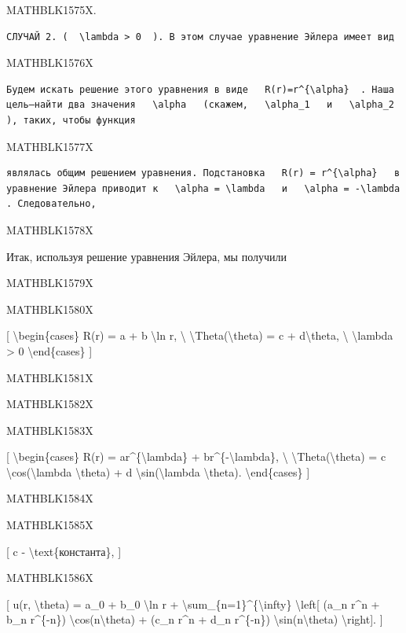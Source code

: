 \documentclass[
]{article}
\begin{document}
MATHBLK1575X.

\begin{verbatim}
СЛУЧАЙ 2. (  \lambda > 0  ). В этом случае уравнение Эйлера имеет вид
\end{verbatim}

MATHBLK1576X

\begin{verbatim}
Будем искать решение этого уравнения в виде   R(r)=r^{\alpha}  . Наша цель—найти два значения   \alpha   (скажем,   \alpha_1   и   \alpha_2  ), таких, чтобы функция
\end{verbatim}

MATHBLK1577X

\begin{verbatim}
являлась общим решением уравнения. Подстановка   R(r) = r^{\alpha}   в уравнение Эйлера приводит к   \alpha = \lambda   и   \alpha = -\lambda  . Следовательно,
\end{verbatim}

MATHBLK1578X

Итак, используя решение уравнения Эйлера, мы получили

MATHBLK1579X

MATHBLK1580X

{[} \textbackslash begin\{cases\} R(r) = a + b \textbackslash ln r,
\textbackslash{} \textbackslash Theta(\textbackslash theta) = c +
d\textbackslash theta, \textbackslash{} \textbackslash lambda
\textgreater{} 0 \textbackslash end\{cases\} {]}

MATHBLK1581X

MATHBLK1582X

MATHBLK1583X

{[} \textbackslash begin\{cases\} R(r) = ar\^{}\{\textbackslash lambda\}
+ br\^{}\{-\textbackslash lambda\}, \textbackslash{}
\textbackslash Theta(\textbackslash theta) = c
\textbackslash cos(\textbackslash lambda \textbackslash theta) + d
\textbackslash sin(\textbackslash lambda \textbackslash theta).
\textbackslash end\{cases\} {]}

MATHBLK1584X

MATHBLK1585X

{[} c - \textbackslash text\{константа\}, {]}

MATHBLK1586X

{[} u(r, \textbackslash theta) = a\_0 + b\_0 \textbackslash ln r +
\textbackslash sum\_\{n=1\}\^{}\{\textbackslash infty\}
\textbackslash left{[} (a\_n r\^{}n + b\_n r\^{}\{-n\})
\textbackslash cos(n\textbackslash theta) + (c\_n r\^{}n + d\_n
r\^{}\{-n\}) \textbackslash sin(n\textbackslash theta)
\textbackslash right{]}. {]}
\end{document}
